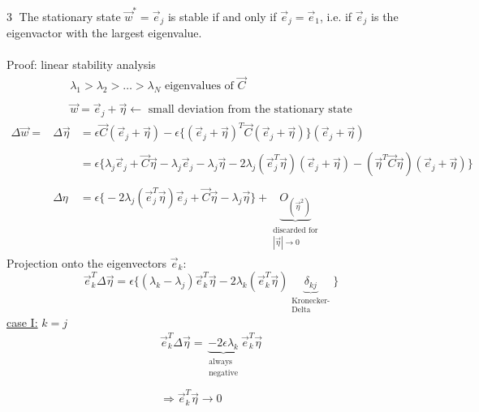 \textcircled{3} The stationary state $\vec{w}^* = \vec{e}_j$ is stable if and only if $\vec{e}_j = \vec{e}_1$, i.e. if $\vec{e}_j$ is the eigenvactor with the largest eigenvalue.\\\\
Proof: linear stability analysis
\[ \begin{array}{l}
	\lambda_1 > \lambda_2 > \ldots > \lambda_N \text{ eigenvalues of } 
		\vec{C} \\\\
	\vec{w} = \vec{e}_j + \vec{\eta} \leftarrow \text{ small deviation
		from the stationary state}
\end{array} \]
\begin{equation}
	\begin{array}{lll}
	\Delta \vec{w} =
	& \Delta \vec{\eta} 
	& = \epsilon \vec{C} (\vec{e}_j + \vec{\eta}) - \epsilon \Big\{
		(\vec{e}_j + \vec{\eta})^T \vec{C} (\vec{e}_j + \vec{\eta})
		\Big\} (\vec{e}_j + \vec{\eta}) \\\\
	&& = \epsilon \Big\{ \lambda_j \vec{e}_j + \vec{C} \vec{\eta} 
		- \lambda_j \vec{e}_j - \lambda_j \vec{\eta} 
		- 2 \lambda_j (\vec{e}_j^T \vec{\eta}) (\vec{e}_j + \vec{\eta})
		- (\vec{\eta}^T \vec{C} \vec{\eta})(\vec{e}_j + \vec{\eta})
		\Big\} \\\\
	& \Delta{\eta} 
	& = \epsilon \Big\{ - 2 \lambda_j (\vec{e}_j^T \vec{\eta}) \vec{e}_j
		+ \vec{C} \vec{\eta} - \lambda_j \vec{\eta}
		\Big\} + \underbrace{ O_{(\vec{\eta}^2)} }_{
			\substack{ \text{discarded for} \\ |\vec{\eta}| 
				\rightarrow 0}}
	\end{array}
\end{equation}
Projection onto the eigenvectors $\vec{e}_k$:
\begin{equation}
	\vec{e}_k^T \Delta \vec{\eta} = \epsilon \Big\{
		(\lambda_k - \lambda_j) \vec{e}_k^T \vec{\eta} 
		- 2 \lambda_k (\vec{e}_k^T \vec{\eta}) 
		\underbrace{ \delta_{kj} }_{\substack{
			\text{Kronecker-} \\ \text{Delta}}}
		\Big\}
\end{equation}
\underline{case I:} $k = j$
\begin{equation}
	\begin{array}{l}
		\vec{e}_k^T \Delta \vec{\eta} = 
		\underbrace{ -2 \epsilon \lambda_k}_{
			\substack{\text{always} \\ \text{negative}}}
		\vec{e}_k^T \vec{\eta} \\\\
		\Rightarrow \vec{e}_k^T \vec{\eta} \rightarrow 0
	\end{array}
\end{equation}
